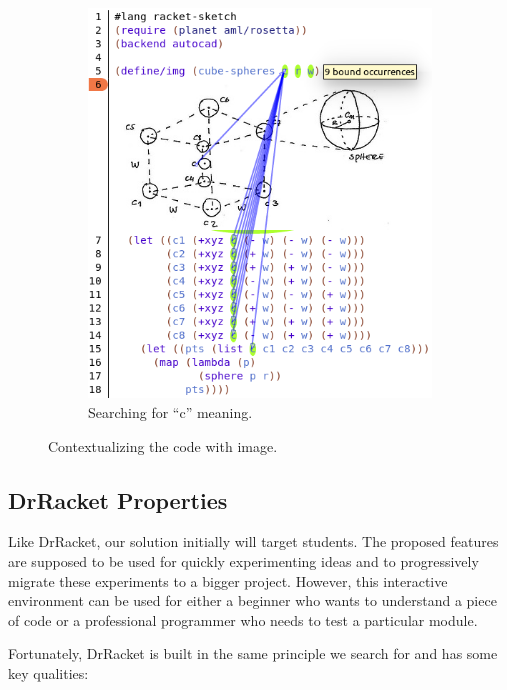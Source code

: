 \begin{figure}
\begin{subfigure}{0.5\textwidth}
                \includegraphics[width=\textwidth]{img/img-code-2}
                \caption{Searching for ``c'' meaning.}
        \end{subfigure}
        \caption{Contextualizing the code with image.}
        \label{fig:img-code}
\end{figure}

\subsection{DrRacket Properties}

Like DrRacket, our solution initially will target students. The proposed features are supposed to be used for quickly experimenting ideas and to progressively migrate these experiments to a bigger project. However, this interactive environment can be used for either a beginner who wants to understand a piece of code or a professional programmer who needs to test a particular module.

Fortunately, DrRacket is built in the same principle we search for and has some key qualities:

